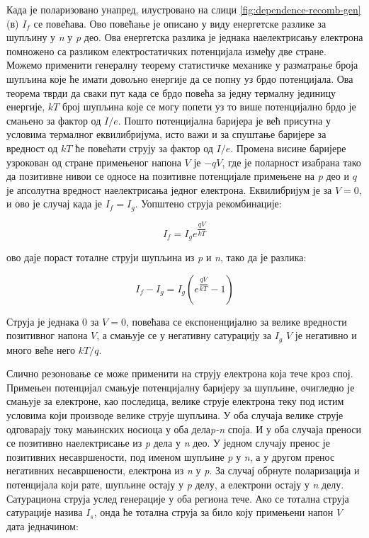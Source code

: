 \documentclass{article}
\begin{document}
Када је поларизовано унапред, илустровано на слици \ref{fig:dependence-recomb-gen} (в) $I_f$ се повећава. Ово повећање је описано у виду енергетске разлике за шупљину у \textit{n} у \textit{p} део. Ова енергетска разлика је једнака наелектрисању електрона помножено са разликом електростатичких потенцијала између две стране. Можемо применити генералну теорему статистичке механике у разматрање броја шупљина које ће имати довољно енергије да се попну уз брдо потенцијала. Ова теорема тврди да сваки пут када се брдо повећа за једну термалну јединицу енергије, $kT$ број шупљина које се могу попети уз то више потенцијално брдо је смањено за фактор од $I/e$. Пошто потенцијална баријера је већ присутна у условима термалног еквилибријума, исто важи и за спуштање баријере за вредност од $kT$ ће повећати струју за фактор од $I/e$. Промена висине баријере узрокован од стране примењеног напона $V$ је $-qV$, где је поларност изабрана тако да позитивне нивои се односе на позитивне потенцијале примењене на \textit{p} део и $q$ је апсолутна вредност наелектрисања једног електрона. Еквилибријум је за $V=0$, и ово је случај када је $I_f = I_g$. Уопштено струја рекомбинације:

\begin{equation}
	I_f = I_g e^{\dfrac{qV}{kT}}
\end{equation}

ово даје пораст тоталне струји шупљина из \textit{p} и \textit{n}, тако да је разлика:

\begin{equation}
	I_f - I_g = I_g (e^{\dfrac{qV}{kT}} - 1)
\end{equation}

Струја је једнака 0 за $V=0$, повећава се експоненцијално за велике вредности позитивног напона $V$, а смањује се у негативну сатурацију за $I_g$ $V$ је негативно и много веће него $kT/q$.

Слично резоновање се може применити на струју електрона која тече кроз спој. Примењен потенцијал смањује потенцијалну баријеру за шупљине, очигледно је смањује за електроне, као последица, велике струје електрона теку под истим условима који производе велике струје шупљина. У оба случаја велике струје одговарају току мањинских носиоца у оба дела\textit{p-n} споја. И у оба случаја преноси се позитивно наелектрисање из \textit{p} дела у \textit{n} део. У једном случају пренос је позитивних несавршености, под именом шупљине \textit{p} у \textit{n}, а у другом пренос негативних несавршености, електрона из \textit{n} у \textit{p}. За случај обрнуте поларизација и потенцијала који рате, шупљине остају у \textit{p} делу, а електрони остају у \textit{n} делу. Сатурациона струја услед генерације у оба региона тече. Ако се тотална струја сатурације назива $I_s$, онда ће тотална струја за било коју примењени напон $V$ дата једначином:
\end{document}
